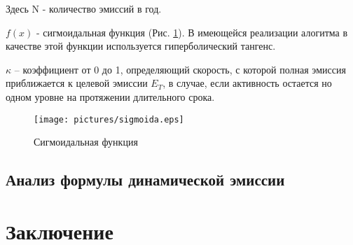 \documentclass[a4paper,12pt]{article}
\begin{document}
Здесь N - количество эмиссий в год.

$f(x)$ - сигмоидальная функция (Рис. \ref{fig:sigmoida}). В имеющейся реализации алогитма в качестве этой функции используется гиперболический тангенс.

$\kappa$ -- коэффициент от 0 до 1, определяющий скорость, с которой полная эмиссия приближается к целевой эмиссии $E_T$, в случае, если активность остается но одном уровне на протяжении длительного срока.

\begin{figure}[h]
      \texttt{[image: pictures/sigmoida.eps]}
      \caption{Сигмоидальная функция}
      \label{fig:sigmoida}
\end{figure}

\subsection{Анализ формулы динамической эмиссии}






\section{Заключение}
\end{document}
